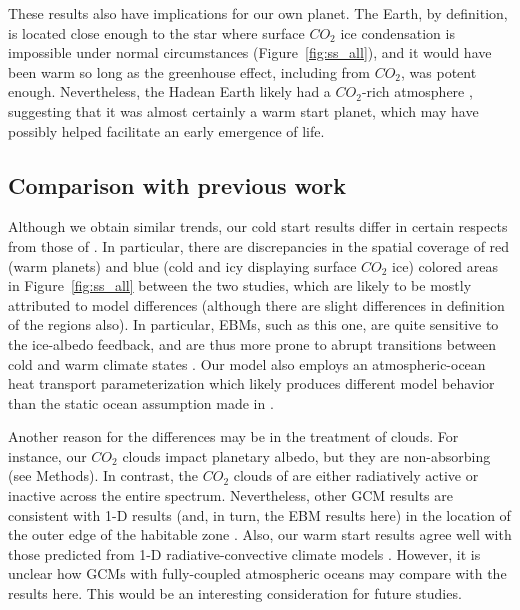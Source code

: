 \documentclass[fleqn,usenatbib]{mnras}
\begin{document}
These results also have implications for our own planet. The Earth, by definition, is located close enough to the star where surface $CO_{\mathrm{2}}$ ice condensation is impossible under normal circumstances (Figure~\ref{fig:ss_all}), and it would have been warm so long as the greenhouse effect, including from $CO_{\mathrm{2}}$, was potent enough. Nevertheless, the Hadean Earth likely had a $CO_{\mathrm{2}}$-rich atmosphere \citep{kasting2014}, suggesting that it was almost certainly a warm start planet, which may have possibly helped facilitate an early emergence of life.

\subsection{Comparison with previous work}
Although we obtain similar trends, our cold start results differ in certain respects from those of \citet{Turbet2017}. In particular, there are discrepancies in the spatial coverage of red (warm planets) and blue (cold and icy displaying surface $CO_{\mathrm{2}}$ ice) colored areas in Figure~\ref{fig:ss_all} between the two studies, which are likely to be mostly attributed to  model differences (although there are slight differences in definition of the regions also). In particular, EBMs, such as this one, are quite sensitive to the ice-albedo feedback, and are thus more prone to abrupt transitions between cold and warm climate states \citep{RamirezLevi2018}. Our model also employs an atmospheric-ocean heat transport parameterization which likely produces different model behavior than the static ocean assumption made in \citet{Turbet2017}. 

Another reason for the differences may be in the treatment of clouds. For instance, our $CO_{\mathrm{2}}$ clouds impact planetary albedo, but they are non-absorbing (see Methods). In contrast, the $CO_{\mathrm{2}}$ clouds of \citet{Turbet2017} are either radiatively active or inactive across the entire spectrum. Nevertheless, other GCM results are consistent with 1-D results (and, in turn, the EBM results here) in the location of the outer edge of the habitable zone \citep{wolf2018erratum}.
Also, our warm start results agree well with those predicted from 1-D radiative-convective climate models \citep{kasting1993, KumarKopparapu2013, Ramirez2018}. However, it is unclear how GCMs with fully-coupled atmospheric oceans may compare with the results here. This would be an interesting consideration for future studies.
\end{document}
